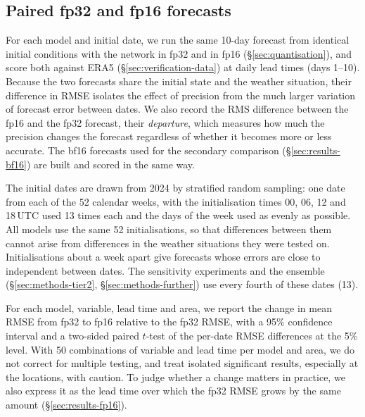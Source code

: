 \subsection{Paired fp32 and fp16 forecasts}
\label{sec:methods-tier1}

For each model and initial date, we run the same 10-day forecast from
identical initial conditions with the network in fp32 and in fp16
(\S\ref{sec:quantisation}), and score both against ERA5
(\S\ref{sec:verification-data}) at daily lead times (days 1--10). Because
the two forecasts share the initial state and the weather situation,
their difference in RMSE isolates the effect of precision from the much
larger variation of forecast error between dates. We also record the RMS
difference between the fp16 and the fp32 forecast, their
\emph{departure}, which measures how much the precision changes the
forecast regardless of whether it becomes more or less accurate. The bf16
forecasts used for the secondary comparison (\S\ref{sec:results-bf16})
are built and scored in the same way.

The initial dates are drawn from 2024 by stratified random sampling:
one date from each of the 52 calendar weeks, with the initialisation
times 00, 06, 12 and 18\,UTC used 13 times each and the days of the week
used as evenly as possible. All models use the same 52
initialisations, so that differences between them cannot arise from
differences in the weather situations they were tested on. Initialisations about a week
apart give forecasts whose errors are close to independent between
dates. The sensitivity experiments and the ensemble
(\S\ref{sec:methods-tier2}, \S\ref{sec:methods-further}) use every fourth
of these dates (13).

For each model, variable, lead time and area, we report the change in
mean RMSE from fp32 to fp16 relative to the fp32 RMSE, with a 95\%
confidence interval and a two-sided paired $t$-test of the per-date RMSE
differences at the 5\% level. With 50 combinations of variable and lead
time per model and area, we do not correct for multiple testing, and
treat isolated significant results, especially at the locations, with
caution. To judge whether a change matters in practice, we also express
it as the lead time over which the fp32 RMSE grows by the same amount
(\S\ref{sec:results-fp16}).

